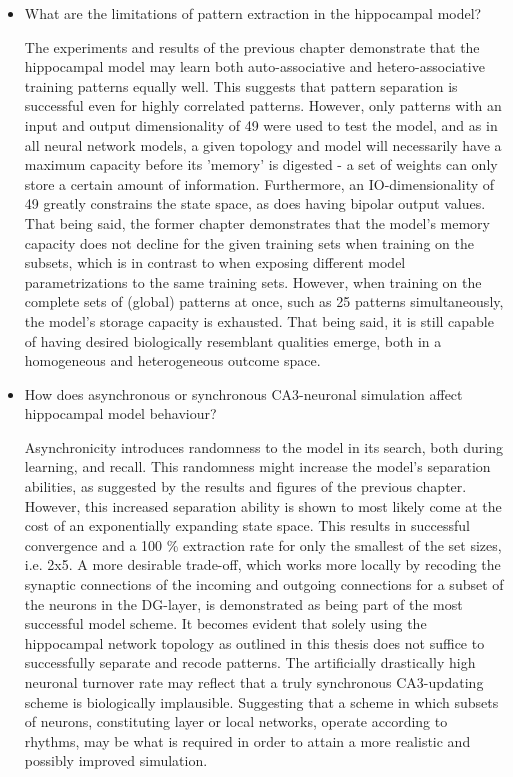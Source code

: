 \begin{itemize}
    \item What are the limitations of pattern extraction in the hippocampal model?
    
    The experiments and results of the previous chapter demonstrate that the hippocampal model may learn both auto-associative and hetero-associative training patterns equally well. This suggests that pattern separation is successful even for highly correlated patterns. However, only patterns with an input and output dimensionality of 49 were used to test the model, and as in all neural network models, a given topology and model will necessarily have a maximum capacity before its 'memory' is digested - a set of weights can only store a certain amount of information. Furthermore, an IO-dimensionality of 49 greatly constrains the state space, as does having bipolar output values. That being said, the former chapter demonstrates that the model's memory capacity does not decline for the given training sets when training on the subsets, which is in contrast to when exposing different model parametrizations to the same training sets. However, when training on the complete sets of (global) patterns at once, such as 25 patterns simultaneously, the model's storage capacity is exhausted.
    That being said, it is still capable of having desired biologically resemblant qualities emerge, both in a homogeneous and heterogeneous outcome space.
    
    \item How does asynchronous or synchronous CA3-neuronal simulation affect hippocampal model behaviour?
    
    Asynchronicity introduces randomness to the model in its search, both during learning, and recall. This randomness might increase the model's separation abilities, as suggested by the results and figures of the previous chapter. However, this increased separation ability is shown to most likely come at the cost of an exponentially expanding state space. This results in successful convergence and a 100 \% extraction rate for only the smallest of the set sizes, i.e. 2x5. A more desirable trade-off, which works more locally by recoding the synaptic connections of the incoming and outgoing connections for a subset of the neurons in the DG-layer, is demonstrated as being part of the most successful model scheme. It becomes evident that solely using the hippocampal network topology as outlined in this thesis does not suffice to successfully separate and recode patterns. The artificially drastically high neuronal turnover rate may reflect that a truly synchronous CA3-updating scheme is biologically implausible. Suggesting that a scheme in which subsets of neurons, constituting layer or local networks, operate according to rhythms, may be what is required in order to attain a more realistic and possibly improved simulation.
    

\end{itemize}
